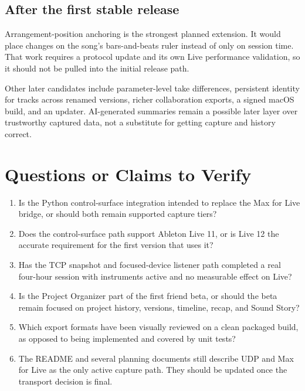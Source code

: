 \documentclass[11pt,letterpaper]{article}
\begin{document}
\subsection{After the first stable release}

Arrangement-position anchoring is the strongest planned extension. It would place
changes on the song's bars-and-beats ruler instead of only on session time. That work
requires a protocol update and its own Live performance validation, so it should not
be pulled into the initial release path.

Other later candidates include parameter-level take differences, persistent identity
for tracks across renamed versions, richer collaboration exports, a signed macOS build,
and an updater. AI-generated summaries remain a possible later layer over trustworthy
captured data, not a substitute for getting capture and history correct.

\section{Questions or Claims to Verify}

\begin{enumerate}
  \item Is the Python control-surface integration intended to replace the Max for Live
        bridge, or should both remain supported capture tiers?
  \item Does the control-surface path support Ableton Live 11, or is Live 12 the accurate
        requirement for the first version that uses it?
  \item Has the TCP snapshot and focused-device listener path completed a real four-hour
        session with instruments active and no measurable effect on Live?
  \item Is the Project Organizer part of the first friend beta, or should the beta remain
        focused on project history, versions, timeline, recap, and Sound Story?
  \item Which export formats have been visually reviewed on a clean packaged build, as
        opposed to being implemented and covered by unit tests?
  \item The README and several planning documents still describe UDP and Max for Live as
        the only active capture path. They should be updated once the transport decision is final.
\end{enumerate}
\end{document}
